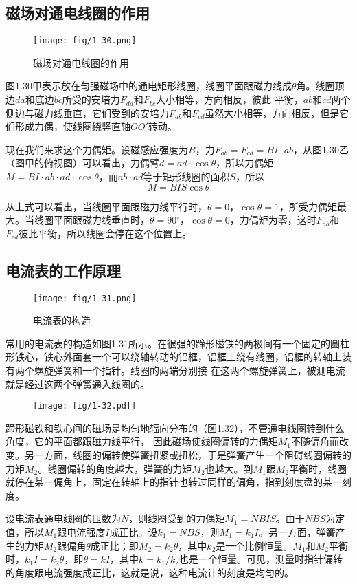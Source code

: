 \subsection{磁场对通电线圈的作用}
    \begin{figure}[htp]\centering
	\texttt{[image: fig/1-30.png]}
	\caption{磁场对通电线圈的作用}
\end{figure}

图1.30甲表示放在匀强磁场中的通电矩形线圈，线圈平面跟磁力线成$\theta$角。线圈顶边$da$和底边$bc$所受的安培力$F_{da}$和$F_{bc}$大小相等，方向相反，彼此
平衡，$ab$和$cd$两个侧边与磁力线垂直，它们受到的安培力$F_{ab}$和$F_{cd}$虽然大小相等，方向相反，但是它们形成力偶，使线圈绕竖直轴$OO'$转动。

现在我们来求这个力偶矩。设磁感应强度为$B$，力$F_{ab}=
F_{cd}=BI·ab$，从图1.30乙（图甲的俯视图）可以看出，力偶臂$d=ad\cdot \cos\theta$，所以力偶矩$M=BI\cdot ab\cdot ad\cdot \cos\theta$，而$ab\cdot ad$等于矩形线圈的面积$S$，所以$$M=BIS\cos\theta$$

从上式可以看出，当线圈平面跟磁力线平行时，$\theta=0$，$\cos\theta=1$，所受力偶矩最大。当线圈平面跟磁力线垂直时，$\theta=90^{\circ}$，$\cos\theta=0$，力偶矩为零，这时$F_{ab}$和$F_{cd}$彼此平衡，所以线圈会停在这个位置上。

\subsection{电流表的工作原理}
    \begin{figure}[htp]\centering
	\texttt{[image: fig/1-31.png]}
	\caption{电流表的构造}
\end{figure}
常用的电流表的构造如图1.31所示。在很强的蹄形磁铁的两极间有一个固定的圆柱形铁心，铁心外面套一个可以绕轴转动的铝框，铝框上绕有线圈，铝框的转轴上装有两个螺旋弹簧和一个指针。线圈的两端分别接
在这两个螺旋弹簧上，被测电流就是经过这两个弹簧通入线圈的。
\begin{figure}[htp]\centering
\texttt{[image: fig/1-32.pdf]}
\caption{}
\end{figure}

蹄形磁铁和铁心间的磁场是均匀地辐向分布的（图1.32），不管通电线圈转到什么角度，它的平面都跟磁力线平行，
因此磁场使线圈偏转的力偶矩$M_1$不随偏角而改变。另一方面，线圈的偏转使弹簧扭紧或扭松，于是弹簧产生一个阻碍线圈偏转的力矩$M_2$。线圈偏转的角度越大，弹簧的力矩$M_2$也越大。到$M_1$跟$M_2$平衡时，线圈就停在某一偏角上，固定在转轴上的指针也转过同样的偏角，指到刻度盘的某一刻度。

设电流表通电线圈的匝数为$N$，则线圈受到的力偶矩$M_1=NBIS$。由于$NBS$为定值，所以$M_1$跟电流强度$I$成正比。设$k_1=NBS$，则$M_1=k_1I$。另一方面，弹簧产生的力矩$M_2$跟偏角$\theta$成正比；即$M_2=k_2\theta$，其中$k_2$是一个比例恒量。$M_1$和$M_2$平衡时，$k_1I=k_2\theta$，即$\theta =kI$，其中$k=k_1/k_2$也是一个恒量。可见，测量时指针偏转的角度跟电流强度成正比，这就是说，这种电流计的刻度是均匀的。

